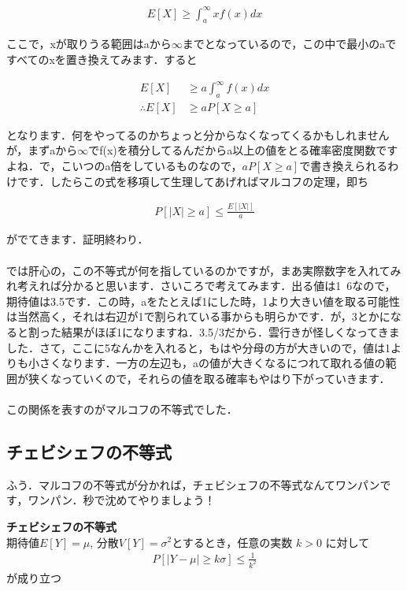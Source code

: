 \documentclass[11pt,a4paper,uplatex]{ujreport} 	%
\begin{document}
\begin{align}
  E[X] \geq \int_a^\infty x f(x)dx
\end{align}

ここで，xが取りうる範囲はaから$\infty$までとなっているので，この中で最小のaですべてのxを置き換えてみます．すると

\begin{align}
  E[X] &\geq a\int_a^\infty f(x)dx\\
  \therefore E[X] &\geq aP[X\geq a]
\end{align}

となります．何をやってるのかちょっと分からなくなってくるかもしれませんが，まずaから$\infty$でf(x)を積分してるんだからa以上の値をとる確率密度関数ですよね．で，こいつのa倍をしているものなので，$aP[X\geq a]$で書き換えられるわけです．したらこの式を移項して生理してあげればマルコフの定理，即ち

\begin{align}
  P[|X|\geq a] \leq \frac{E[|X|]}{a}
\end{align}

がでてきます．証明終わり．\\
\\

では肝心の，この不等式が何を指しているのかですが，まあ実際数字を入れてみれ考えれば分かると思います．さいころで考えてみます．出る値は1~6なので，期待値は3.5です．この時，aをたとえば1にした時，1より大きい値を取る可能性は当然高く，それは右辺が1で割られている事からも明らかです．が，3とかになると割った結果がほぼ1になりますね．3.5/3だから．雲行きが怪しくなってきました．さて，ここに5なんかを入れると，もはや分母の方が大きいので，値は1よりも小さくなります．一方の左辺も，aの値が大きくなるにつれて取れる値の範囲が狭くなっていくので，それらの値を取る確率もやはり下がっていきます．\\
\\

この関係を表すのがマルコフの不等式でした．

\subsection{チェビシェフの不等式}
ふう．マルコフの不等式が分かれば，チェビシェフの不等式なんてワンパンです，ワンパン．秒で沈めてやりましょう！

\begin{screen}
  \textbf{チェビシェフの不等式}\\
  期待値$E[Y] = \mu$, 分散$V[Y] = \sigma^2$とするとき，任意の実数 $k>0$ に対して
  \begin{align}
    P[|Y-\mu| \geq k\sigma] \leq \frac{1}{k^2}
    \label{eq:cheb}
  \end{align}
  が成り立つ
\end{screen}
\end{document}
